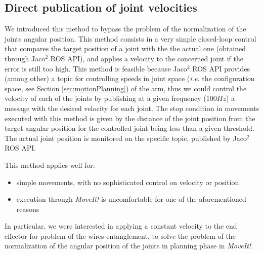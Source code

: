 \subsection{Direct publication of joint velocities}
We introduced this method to bypass the problem of the normalization of the joints angular position. This method consists in a very simple closed-loop control that compares the target position of a joint with the the actual one (obtained through Jaco$^2$ \ac{ROS} \ac{API}), and applies a velocity to the concerned joint if the error is still too high. This method is feasible because Jaco$^2$ \ac{ROS} \ac{API} provides (among other) a topic for controlling speeds in joint space (\textit{i.e.} the configuration space, see Section \ref{sec:motionPlanning}) of the arm, thus we could control the velocity of each of the joints by publishing at a given frequency ($100Hz$) a message with the desired velocity for each joint. The stop condition in movements executed with this method is given by the distance of the joint position from the target angular position for the controlled joint being less than a given threshold. The actual joint position is monitored on the specific topic, published by Jaco$^2$ \ac{ROS} \ac{API}.

This method applies well for:
\begin{itemize}
	\item simple movements, with no sophisticated control on velocity or position
	\item execution through \textit{MoveIt!} is uncomfortable for one of the aforementioned reasons
\end{itemize}
In particular, we were interested in applying a constant velocity to the end effector for problem of the wires entanglement, to solve the problem of the normalization of the angular position of the joints in planning phase in \textit{MoveIt!}.

